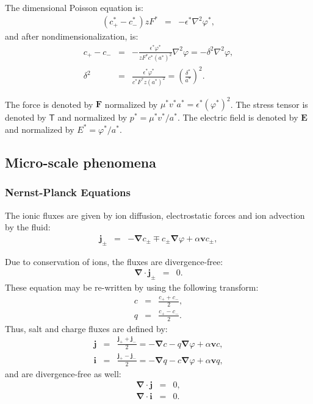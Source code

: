 \documentclass[final]{elsarticle}
\newcommand\eps \epsilon
\newcommand{\pars}[1]{\left(#1\right)}
\newcommand\Laplacian{\nabla^2}
\newcommand\bnabla{\boldsymbol{\nabla}}
\newcommand\bv{\boldsymbol{v}}
\newcommand\bE{\boldsymbol{E}}
\newcommand\bj{\boldsymbol{j}}
\newcommand\bi{\boldsymbol{i}}
\newcommand\bF{\boldsymbol{F}}
\newcommand\tT{\mathsf{T}}
\begin{document}
The dimensional Poisson equation is:
\begin{eqnarray*}
(c^*_+ - c^*_-) z F^* &=& -\eps^* \Laplacian \varphi^*,
\end{eqnarray*}
and after nondimensionalization, is:
\begin{eqnarray*}
c_+ - c_- &=& -\frac{\eps^* \varphi^*}{z F^* c^* (a^*)^2} \Laplacian \varphi = 
-\delta^2 \Laplacian \varphi,
\\
\delta^2 &=& \frac{\eps^* \varphi^*}{c^* F^* z (a^*)^2} = 
\pars{\frac{\delta^*}{a^*}}^2.
\end{eqnarray*}

The force is denoted by $\bF$ normalized by $\mu^* v^* a^* = \eps^* (\varphi^*)^2$.
The stress tensor is denoted by $\tT$ and normalized by $p^* = \mu^* v^* / a^*$.
The electric field is denoted by $\bE$ and normalized by $E^* = \varphi^* / a^*$.

\subsection{Micro-scale phenomena}

\subsubsection{Nernst-Planck Equations}
The ionic fluxes are given by ion diffusion, electrostatic forces and ion advection by the fluid:
\begin{eqnarray*}
  \bj_\pm &=& -\bnabla c_\pm \mp c_\pm \bnabla \varphi + \alpha \bv c_\pm,
\end{eqnarray*}

Due to conservation of ions, the fluxes are divergence-free:
\begin{eqnarray*}
\bnabla \cdot \bj_\pm &=& 0.
\end{eqnarray*}
These equation may be re-written by using the following transform:
\begin{eqnarray*}
  c &=& \frac{c_+ + c_-}{2},\\
  q &=& \frac{c_+ - c_-}{2}.
\end{eqnarray*}
Thus, salt and charge fluxes are defined by:
\begin{eqnarray*}
  \bj &=& \frac{\bj_+ + \bj_-}{2} = -\bnabla c - q \bnabla \varphi + \alpha \bv c, \\
  \bi &=& \frac{\bj_+ - \bj_-}{2} = -\bnabla q - c \bnabla \varphi + \alpha \bv q,
\end{eqnarray*}
and are divergence-free as well:
\begin{eqnarray*}
\bnabla \cdot \bj &=& 0, \\
\bnabla \cdot \bi &=& 0. 
\end{eqnarray*}
\end{document}
